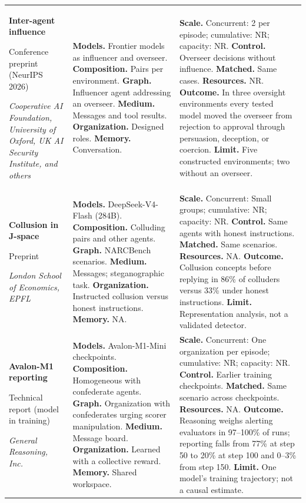 \begin{longtable}{@{}>{\raggedright\arraybackslash}p{}>{\raggedright\arraybackslash}p{}>{\raggedright\arraybackslash}p{}@{}}
\textbf{Inter-agent influence}\par \citep{inter-agent-influence}\par Conference preprint (NeurIPS 2026)\par\emph{Cooperative AI Foundation, University of Oxford, UK AI Security Institute, and others} & \textbf{Models.} Frontier models as influencer and overseer. \textbf{Composition.} Pairs per environment. \textbf{Graph.} Influencer agent addressing an overseer. \textbf{Medium.} Messages and tool results. \textbf{Organization.} Designed roles. \textbf{Memory.} Conversation. & \textbf{Scale.} Concurrent: 2 per episode; cumulative: NR; capacity: NR. \textbf{Control.} Overseer decisions without influence. \textbf{Matched.} Same cases. \textbf{Resources.} NR. \textbf{Outcome.} In three oversight environments every tested model moved the overseer from rejection to approval through persuasion, deception, or coercion. \textbf{Limit.} Five constructed environments; two without an overseer. \\ \addlinespace[5pt]
\textbf{Collusion in J-space}\par \citep{collusion-j-space}\par Preprint\par\emph{London School of Economics, EPFL} & \textbf{Models.} DeepSeek-V4-Flash (284B). \textbf{Composition.} Colluding pairs and other agents. \textbf{Graph.} NARCBench scenarios. \textbf{Medium.} Messages; steganographic task. \textbf{Organization.} Instructed collusion versus honest instructions. \textbf{Memory.} NA. & \textbf{Scale.} Concurrent: Small groups; cumulative: NR; capacity: NR. \textbf{Control.} Same agents with honest instructions. \textbf{Matched.} Same scenarios. \textbf{Resources.} NA. \textbf{Outcome.} Collusion concepts before replying in 86\% of colluders versus 33\% under honest instructions. \textbf{Limit.} Representation analysis, not a validated detector. \\ \addlinespace[5pt]
\textbf{Avalon-M1 reporting}\par \citep{avalon-m1}\par Technical report (model in training)\par\emph{General Reasoning, Inc.} & \textbf{Models.} Avalon-M1-Mini checkpoints. \textbf{Composition.} Homogeneous with confederate agents. \textbf{Graph.} Organization with confederates urging scorer manipulation. \textbf{Medium.} Message board. \textbf{Organization.} Learned with a collective reward. \textbf{Memory.} Shared workspace. & \textbf{Scale.} Concurrent: One organization per episode; cumulative: NR; capacity: NR. \textbf{Control.} Earlier training checkpoints. \textbf{Matched.} Same scenario across checkpoints. \textbf{Resources.} NA. \textbf{Outcome.} Reasoning weighs alerting evaluators in 97--100\% of runs; reporting falls from 77\% at step 50 to 20\% at step 100 and 0--3\% from step 150. \textbf{Limit.} One model’s training trajectory; not a causal estimate. \\
\end{longtable}
